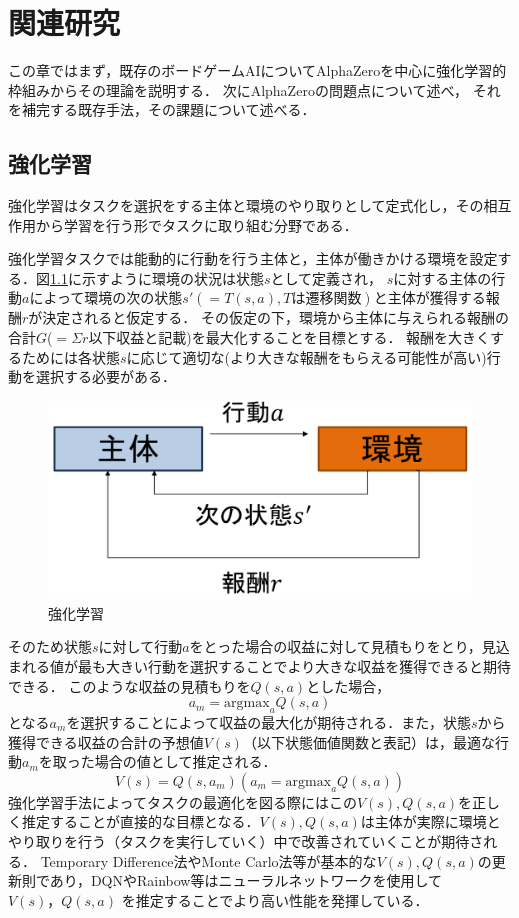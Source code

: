 \chapter{関連研究}
この章ではまず，既存のボードゲームAIについてAlphaZeroを中心に強化学習的枠組みからその理論を説明する．
次にAlphaZeroの問題点について述べ，
それを補完する既存手法，その課題について述べる．



\section{強化学習}
強化学習はタスクを選択をする主体と環境のやり取りとして定式化し，その相互作用から学習を行う形でタスクに取り組む分野である\cite{RL}．

強化学習タスクでは能動的に行動を行う主体と，主体が働きかける環境を設定する．図\ref{fig:RL}に示すように環境の状況は状態$s$として定義され，
$s$に対する主体の行動$a$によって環境の次の状態${s'}(=T(s, a), Tは遷移関数)$と主体が獲得する報酬$r$が決定されると仮定する．
その仮定の下，環境から主体に与えられる報酬の合計$G$($=\Sigma r$以下収益と記載)を最大化することを目標とする．
報酬を大きくするためには各状態$s$に応じて適切な(より大きな報酬をもらえる可能性が高い)行動を選択する必要がある．
\begin{figure}[t]
	\centering
	\includegraphics[width=\linewidth]{./figure/RL.png}
	\caption{強化学習}
	\label{fig:RL}
\end{figure}
そのため状態$s$に対して行動$a$をとった場合の収益に対して見積もりをとり，見込まれる値が最も大きい行動を選択することでより大きな収益を獲得できると期待できる．
このような収益の見積もりを$Q(s, a)$とした場合，
\begin{equation}
	{\displaystyle a_m = {\textrm{argmax}}_{a} Q(s, a)}
\end{equation}
となる$a_m$を選択することによって収益の最大化が期待される．また，状態$s$から獲得できる収益の合計の予想値$V(s)$（以下状態価値関数と表記）は，最適な行動$a_m$を取った場合の値として推定される．
\begin{equation}
	{\displaystyle V(s) = Q(s, a_m)(a_m = \textrm{argmax}_{a} Q(s, a))}
\end{equation}
強化学習手法によってタスクの最適化を図る際にはこの$V(s),Q(s, a)$を正しく推定することが直接的な目標となる．$V(s),Q(s, a)$は主体が実際に環境とやり取りを行う（タスクを実行していく）中で改善されていくことが期待される．
Temporary Difference法やMonte Carlo法等が基本的な$V(s),Q(s, a)$の更新則であり，DQN\cite{DQN}やRainbow\cite{rainbow}等はニューラルネットワークを使用して$V(s)，Q(s, a)$
を推定することでより高い性能を発揮している．



